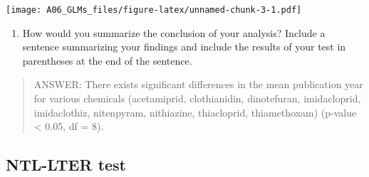 \documentclass[]{article}
\newenvironment{Shaded}{\begin{snugshade}}{\end{snugshade}}
\newcommand{\KeywordTok}[1]{\textcolor[rgb]{0.13,0.29,0.53}{\textbf{#1}}}
\newcommand{\DataTypeTok}[1]{\textcolor[rgb]{0.13,0.29,0.53}{#1}}
\newcommand{\DecValTok}[1]{\textcolor[rgb]{0.00,0.00,0.81}{#1}}
\newcommand{\StringTok}[1]{\textcolor[rgb]{0.31,0.60,0.02}{#1}}
\newcommand{\CommentTok}[1]{\textcolor[rgb]{0.56,0.35,0.01}{\textit{#1}}}
\newcommand{\OtherTok}[1]{\textcolor[rgb]{0.56,0.35,0.01}{#1}}
\newcommand{\OperatorTok}[1]{\textcolor[rgb]{0.81,0.36,0.00}{\textbf{#1}}}
\newcommand{\NormalTok}[1]{#1}
\providecommand{\tightlist}{%
  \setlength{\itemsep}{0pt}\setlength{\parskip}{0pt}}
\begin{document}
\begin{Shaded}
\end{Shaded}

\texttt{[image: A06\_GLMs\_files/figure-latex/unnamed-chunk-3-1.pdf]}

\begin{enumerate}
\def\labelenumi{\arabic{enumi}.}
\setcounter{enumi}{8}
\tightlist
\item
  How would you summarize the conclusion of your analysis? Include a
  sentence summarizing your findings and include the results of your
  test in parentheses at the end of the sentence.
\end{enumerate}

\begin{quote}
ANSWER: There exists significant differences in the mean publication
year for various chemicals (acetamiprid, clothianidin, dinotefuran,
imidacloprid, imidaclothiz, nitenpyram, nithiazine, thiacloprid,
thiamethoxam) (p-value \textless{} 0.05, df = 8).
\end{quote}

\subsection{NTL-LTER test}\label{ntl-lter-test}
\end{document}
